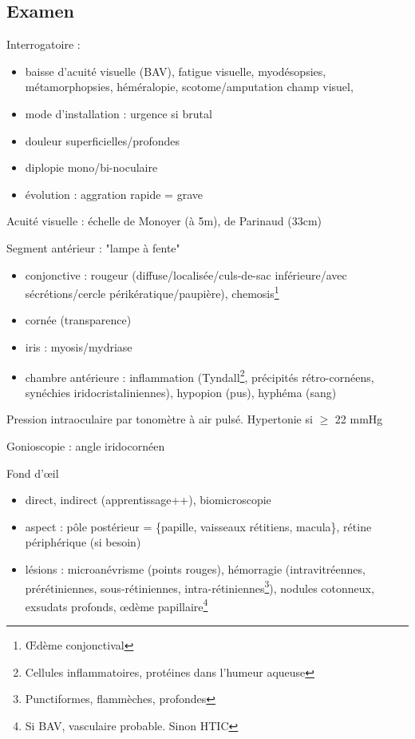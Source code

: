 \documentclass[11pt]{article}
\begin{document}
\subsection{Examen}
\label{sec:org8716406}
Interrogatoire : 
\begin{itemize}
\item baisse d'acuité visuelle (BAV), fatigue visuelle, myodésopsies, métamorphopsies, héméralopie, scotome/amputation champ visuel,
\item mode d'installation : urgence si brutal \faBomb
\item douleur superficielles/profondes
\item diplopie mono/bi-noculaire
\item évolution : aggration rapide = grave
\end{itemize}
Acuité visuelle : échelle de Monoyer (à 5m), de Parinaud (33cm)

Segment antérieur : "lampe à fente"
\begin{itemize}
\item conjonctive : rougeur (diffuse/localisée/culs-de-sac inférieure/avec
sécrétions/cercle périkératique/paupière), chemosis\footnote{\OE{}dème conjonctival}
\item cornée (transparence)
\item iris : myosis/mydriase
\item chambre antérieure : inflammation (Tyndall\footnote{Cellules inflammatoires, protéines dans l'humeur aqueuse}, précipités rétro-cornéens,
synéchies iridocristaliniennes), hypopion (pus), hyphéma (sang)
\end{itemize}
Pression intraoculaire par tonomètre à air pulsé. Hypertonie si \(\ge\) 22 mmHg

Gonioscopie : angle iridocornéen

Fond d'\oe{}il
\begin{itemize}
\item direct, indirect (apprentissage++), biomicroscopie
\item aspect : pôle postérieur = \{papille, vaisseaux rétitiens, macula\}, rétine
périphérique (si besoin)
\item lésions : microanévrisme (points rouges), hémorragie (intravitréennes,
prérétiniennes, sous-rétiniennes, intra-rétiniennes\footnote{Punctiformes, flammèches, profondes}), nodules cotonneux,
exsudats profonds, \oe{}dème papillaire\footnote{Si BAV, vasculaire probable. Sinon HTIC}
\end{itemize}
\end{document}
